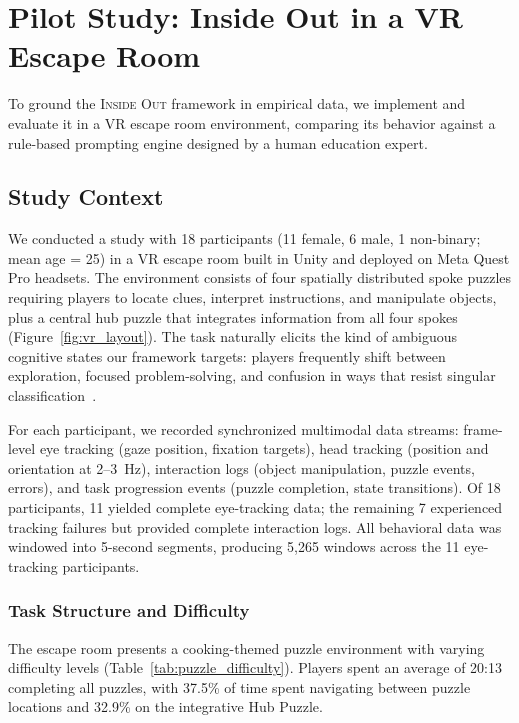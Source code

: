 \section{Pilot Study: Inside Out in a VR Escape Room}
\label{sec:pilot}

To ground the \textsc{Inside Out} framework in empirical data, we implement and evaluate it in a VR escape room environment, comparing its behavior against a rule-based prompting engine designed by a human education expert.

\subsection{Study Context}

We conducted a study with 18 participants (11 female, 6 male, 1 non-binary; mean age = 25) in a VR escape room built in Unity and deployed on Meta Quest Pro headsets. The environment consists of four spatially distributed spoke puzzles requiring players to locate clues, interpret instructions, and manipulate objects, plus a central hub puzzle that integrates information from all four spokes (Figure~\ref{fig:vr_layout}). The task naturally elicits the kind of ambiguous cognitive states our framework targets: players frequently shift between exploration, focused problem-solving, and confusion in ways that resist singular classification~\cite{radianti2020systematic, jensen2018review}.

For each participant, we recorded synchronized multimodal data streams: frame-level eye tracking (gaze position, fixation targets), head tracking (position and orientation at 2--3~Hz), interaction logs (object manipulation, puzzle events, errors), and task progression events (puzzle completion, state transitions). Of 18 participants, 11 yielded complete eye-tracking data; the remaining 7 experienced tracking failures but provided complete interaction logs. All behavioral data was windowed into 5-second segments, producing 5,265 windows across the 11 eye-tracking participants.

\subsubsection{Task Structure and Difficulty}

The escape room presents a cooking-themed puzzle environment with varying difficulty levels (Table~\ref{tab:puzzle_difficulty}). Players spent an average of 20:13 completing all puzzles, with 37.5\% of time spent navigating between puzzle locations and 32.9\% on the integrative Hub Puzzle.

